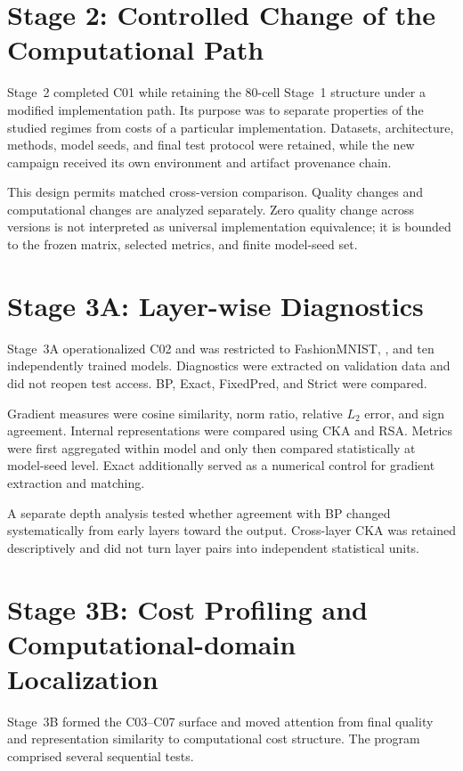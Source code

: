 \section{Stage 2: Controlled Change of the Computational Path}
\label{sec:stage2-experiment-en}

Stage~2 completed C01 while retaining the 80-cell Stage~1 structure under a modified
implementation path. Its purpose was to separate properties of the studied regimes
from costs of a particular implementation. Datasets, architecture, methods, model
seeds, and final test protocol were retained, while the new campaign received its own
environment and artifact provenance chain.

This design permits matched cross-version comparison. Quality changes and
computational changes are analyzed separately. Zero quality change across versions is
not interpreted as universal implementation equivalence; it is bounded to the frozen
matrix, selected metrics, and finite model-seed set.

\section{Stage 3A: Layer-wise Diagnostics}
\label{sec:stage3a-experiment-en}

Stage~3A operationalized C02 and was restricted to FashionMNIST,
, and ten independently trained models. Diagnostics were
extracted on validation data and did not reopen test access. BP, Exact, FixedPred, and
Strict were compared.

Gradient measures were cosine similarity, norm ratio, relative \(L_2\) error, and sign
agreement. Internal representations were compared using CKA and RSA. Metrics were
first aggregated within model and only then compared statistically at model-seed level.
Exact additionally served as a numerical control for gradient extraction and matching.

A separate depth analysis tested whether agreement with BP changed systematically from
early layers toward the output. Cross-layer CKA was retained descriptively and did not
turn layer pairs into independent statistical units.

\section{Stage 3B: Cost Profiling and Computational-domain Localization}
\label{sec:stage3b-experiment-en}

Stage~3B formed the C03--C07 surface and moved attention from final quality and
representation similarity to computational cost structure. The program comprised
several sequential tests.

